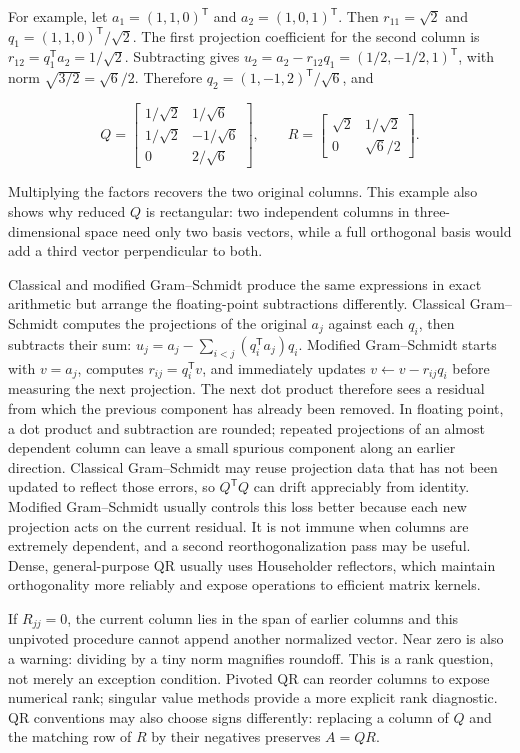 For example, let \(a_1=(1,1,0)^\mathsf T\) and \(a_2=(1,0,1)^\mathsf T\). Then \(r_{11}=\sqrt2\) and \(q_1=(1,1,0)^\mathsf T/\sqrt2\). The first projection coefficient for the second column is \(r_{12}=q_1^\mathsf Ta_2=1/\sqrt2\). Subtracting gives \(u_2=a_2-r_{12}q_1=(1/2,-1/2,1)^\mathsf T\), with norm \(\sqrt{3/2}=\sqrt6/2\). Therefore \(q_2=(1,-1,2)^\mathsf T/\sqrt6\), and

\[
Q=\begin{bmatrix}1/\sqrt2&1/\sqrt6\\1/\sqrt2&-1/\sqrt6\\0&2/\sqrt6\end{bmatrix},\qquad
R=\begin{bmatrix}\sqrt2&1/\sqrt2\\0&\sqrt6/2\end{bmatrix}.
\]

Multiplying the factors recovers the two original columns. This example also shows why reduced \(Q\) is rectangular: two independent columns in three-dimensional space need only two basis vectors, while a full orthogonal basis would add a third vector perpendicular to both.

Classical and modified Gram--Schmidt produce the same expressions in exact arithmetic but arrange the floating-point subtractions differently. Classical Gram--Schmidt computes the projections of the original \(a_j\) against each \(q_i\), then subtracts their sum: \(u_j=a_j-\sum_{i<j}(q_i^\mathsf Ta_j)q_i\). Modified Gram--Schmidt starts with \(v=a_j\), computes \(r_{ij}=q_i^\mathsf Tv\), and immediately updates \(v\leftarrow v-r_{ij}q_i\) before measuring the next projection. The next dot product therefore sees a residual from which the previous component has already been removed. In floating point, a dot product and subtraction are rounded; repeated projections of an almost dependent column can leave a small spurious component along an earlier direction. Classical Gram--Schmidt may reuse projection data that has not been updated to reflect those errors, so \(Q^\mathsf TQ\) can drift appreciably from identity. Modified Gram--Schmidt usually controls this loss better because each new projection acts on the current residual. It is not immune when columns are extremely dependent, and a second reorthogonalization pass may be useful. Dense, general-purpose QR usually uses Householder reflectors, which maintain orthogonality more reliably and expose operations to efficient matrix kernels.

If \(R_{jj}=0\), the current column lies in the span of earlier columns and this unpivoted procedure cannot append another normalized vector. Near zero is also a warning: dividing by a tiny norm magnifies roundoff. This is a rank question, not merely an exception condition. Pivoted QR can reorder columns to expose numerical rank; singular value methods provide a more explicit rank diagnostic. QR conventions may also choose signs differently: replacing a column of \(Q\) and the matching row of \(R\) by their negatives preserves \(A=QR\).

